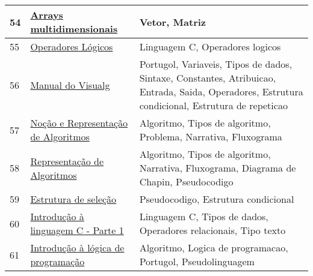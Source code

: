 \begin{longtable}{| p{} | p{} | p{} |}
54  & \href{http://www.inf.ufpr.br/cursos/ci067/Docs/NotasAula/notas-19\_Arrays\_Multidimensionais.html}{Arrays multidimensionais                                                            } & Vetor, Matriz                                                                                                                                     \\ \hline
55  & \href{http://www.inf.ufpr.br/cursos/ci067/Docs/NotasAula/notas-6\_Operadores\_Logicos.html}{Operadores Lógicos                                                                  } & Linguagem C, Operadores logicos                                                                                                                   \\ \hline
56  & \href{http://www.inf.ufsc.br/~bosco/ensino/ine5201/ApostilaVisuAlg20.pdf}{Manual do Visualg                                                                   } & Portugol, Variaveis, Tipos de dados, Sintaxe, Constantes, Atribuicao, Entrada, Saida, Operadores, Estrutura condicional, Estrutura de repeticao   \\ \hline
57  & \href{http://www.ipb.pt/~cmca/algor1.pdf}{Noção e Representação de Algoritmos                                                 } & Algoritmo, Tipos de algoritmo, Problema, Narrativa, Fluxograma                                                                                    \\ \hline
58  & \href{http://www.omundodaprogramacao.com/representacao-de-algoritmos/}{Representação de Algoritmos                                                         } & Algoritmo, Tipos de algoritmo, Narrativa, Fluxograma, Diagrama de Chapin, Pseudocodigo                                                            \\ \hline
59  & \href{http://www.rafaeltoledo.net/estruturas-de-selecao/}{Estrutura de seleção                                                                } & Pseudocodigo, Estrutura condicional                                                                                                               \\ \hline
60  & \href{http://www.rafaeltoledo.net/introducao-a-linguagem-c-parte-i/}{Introdução à linguagem C - Parte 1                                                  } & Linguagem C, Tipos de dados, Operadores relacionais, Tipo texto                                                                                   \\ \hline
61  & \href{http://www.rafaeltoledo.net/introducao-a-logica-de-programacao/}{Introdução à lógica de programação                                                  } & Algoritmo, Logica de programacao, Portugol, Pseudolinguagem                                                                                       \\ \hline

\end{longtable}
